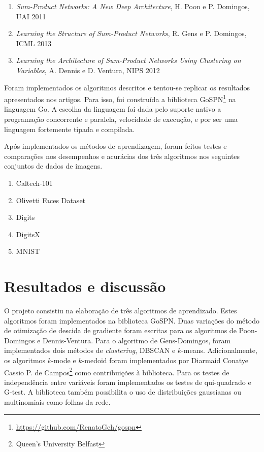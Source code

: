 \documentclass[12pt]{article}
\theoremstyle{plain}
\numberwithin{equation}{section}
\begin{document}
\begin{enumerate}
  \item \textit{Sum-Product Networks: A New Deep Architecture}, H. Poon e P. Domingos, UAI
    2011~\cite{poon-domingos}
  \item \textit{Learning the Structure of Sum-Product Networks}, R. Gens e P. Domingos, ICML
    2013~\cite{gens-domingos}
  \item \textit{Learning the Architecture of Sum-Product Networks Using Clustering on Variables},
    A. Dennis e D. Ventura, NIPS 2012~\cite{clustering}
\end{enumerate}

Foram implementados os algoritmos descritos e tentou-se replicar os resultados apresentados nos
artigos. Para isso, foi construída a biblioteca
GoSPN\footnote{\url{https://github.com/RenatoGeh/gospn}} na linguagem Go. A escolha da linguagem
foi dada pelo suporte nativo a programação concorrente e paralela, velocidade de execução, e por
ser uma linguagem fortemente tipada e compilada.

Após implementados os métodos de aprendizagem, foram feitos testes e comparações nos desempenhos e
acurácias dos três algoritmos nos seguintes conjuntos de dados de imagens.

\begin{enumerate}[label=\,(\alph*)]
  \item Caltech-101~\cite{caltech101}
  \item Olivetti Faces Dataset~\cite{olivetti}
  \item Digits~\cite{digits}
  \item DigitsX~\cite{digitsx}
  \item MNIST~\cite{mnist}
\end{enumerate}

\section{Resultados e discussão}

O projeto consistiu na elaboração de três algoritmos de aprendizado. Estes algoritmos foram
implementados na biblioteca GoSPN\footnotemark[1]. Duas variações do método de otimização de
descida de gradiente foram escritas para os algoritmos de Poon-Domingos e Dennis-Ventura. Para o
algoritmo de Gens-Domingos, foram implementados dois métodos de \textit{clustering}, DBSCAN e
$k$-means. Adicionalmente, os algoritmos $k$-mode e $k$-medoid foram implementados por Diarmaid
Conaty\footnotemark[2] e Cassio P. de Campos\footnote{Queen's University Belfast} como
contribuições à biblioteca. Para os testes de independência entre variáveis foram implementados os
testes de qui-quadrado e G-test. A biblioteca também possibilita o uso de distribuições gaussianas
ou multinomiais como folhas da rede.
\end{document}
